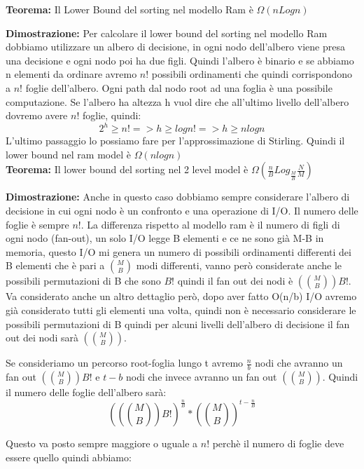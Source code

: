 \documentclass[12pt]{article}
\begin{document}
\textbf{Teorema:} Il Lower Bound del sorting nel modello Ram è $\Omega(nLogn)$


\textbf{Dimostrazione:} 
Per calcolare il lower bound del sorting nel modello Ram dobbiamo utilizzare un albero di decisione, in ogni nodo dell'albero viene presa una decisione e ogni nodo poi ha due figli. Quindi l'albero è binario e se abbiamo n elementi da ordinare avremo $n!$ possibili ordinamenti che quindi corrispondono a $n!$ foglie dell'albero.
Ogni path dal nodo root ad una foglia è una possibile computazione.
Se l'albero ha altezza h vuol dire che all'ultimo livello dell'albero dovremo avere $n!$ foglie, quindi:
\begin{equation}
    2^h \geq n! => h \geq log n! => h \geq n log n
\end{equation}
L'ultimo passaggio lo possiamo fare per l'approssimazione di Stirling. Quindi il lower bound nel ram model è $\Omega(nlogn)$ \\

\textbf{Teorema:} Il lower bound del sorting nel 2 level model è $\Omega(\frac{n}{B} Log_{\frac{M}{B}}\frac{N}{M})$

\textbf{Dimostrazione:} 
Anche in questo caso dobbiamo sempre considerare l'albero di decisione in cui ogni nodo è un confronto e una operazione di I/O. Il numero delle foglie è sempre $n!$. 
La differenza rispetto al modello ram è il numero di figli di ogni nodo (fan-out), un solo I/O legge B elementi e ce ne sono già M-B in memoria, questo I/O mi genera un numero di possibili ordinamenti differenti dei B elementi che è pari a $\binom{M}{B}$ modi differenti, vanno però considerate anche le possibili permutazioni di B che sono $B!$ quindi il fan out dei nodi è $(\binom{M}{B})B!$.
Va considerato anche un altro dettaglio però, dopo aver fatto O(n/b) I/O avremo già considerato tutti gli elementi una volta, quindi non è necessario considerare le possibili permutazioni di B quindi per alcuni livelli dell'albero di decisione il fan out dei nodi sarà $(\binom{M}{B})$.

Se consideriamo un percorso root-foglia lungo t avremo $\frac{n}{b}$ nodi che avranno un fan out $(\binom{M}{B})B!$ e $t-b$ nodi che invece avranno un fan out $(\binom{M}{B})$.
Quindi il numero delle foglie dell'albero sarà:
\begin{equation}
    ((\binom{M}{B})B!)^{\frac{n}{B}} * (\binom{M}{B})^{t-\frac{n}{B}} 
\end{equation}

Questo va posto sempre maggiore o uguale a $n!$ perchè il numero di foglie deve essere quello quindi abbiamo:
\end{document}
